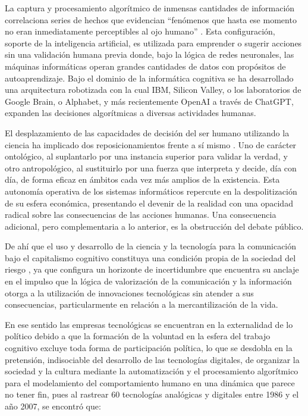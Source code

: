 \documentclass[
  spanish,
  11pt,
  a4paper,
]{scrbook}
\begin{document}
La captura y procesamiento algorítmico de inmensas cantidades de
información correlaciona series de hechos que evidencian ``fenómenos que
hasta ese momento no eran inmediatamente perceptibles al ojo humano''
\autocite[143]{Sadin2018}. Esta configuración, soporte de la
inteligencia artificial, es utilizada para emprender o sugerir acciones
sin una validación humana previa donde, bajo la lógica de redes
neuronales, las máquinas informáticas operan grandes cantidades de datos
con propósitos de autoaprendizaje. Bajo el dominio de la informática
cognitiva se ha desarrollado una arquitectura robotizada con la cual
IBM, Silicon Valley, o los laboratorios de Google Brain, o Alphabet, y
más recientemente OpenAI a través de ChatGPT, expanden las decisiones
algorítmicas a diversas actividades humanas.

El desplazamiento de las capacidades de decisión del ser humano
utilizando la ciencia ha implicado dos reposicionamientos frente a sí
mismo \autocite{Sadin2018}. Uno de carácter ontológico, al suplantarlo
por una instancia superior para validar la verdad, y otro antropológico,
al sustituirlo por una fuerza que interpreta y decide, día con día, de
forma eficaz en ámbitos cada vez más amplios de la existencia. Esta
autonomía operativa de los sistemas informáticos repercute en la
despolitización de su esfera económica, presentando el devenir de la
realidad con una opacidad radical sobre las consecuencias de las
acciones humanas. Una consecuencia adicional, pero complementaria a lo
anterior, es la obstrucción del debate público.

De ahí que el uso y desarrollo de la ciencia y la tecnología para la
comunicación bajo el capitalismo cognitivo constituya una condición
propia de la sociedad del riesgo \autocite{Beck1998}, ya que configura
un horizonte de incertidumbre que encuentra su anclaje en el impulso que
la lógica de valorización de la comunicación y la información otorga a
la utilización de innovaciones tecnológicas sin atender a sus
consecuencias, particularmente en relación a la mercantilización de la
vida.

En ese sentido las empresas tecnológicas se encuentran en la
externalidad de lo político debido a que la formación de la voluntad en
la esfera del trabajo cognitivo excluye toda forma de participación
política, lo que se desdobla en la pretensión, indisociable del
desarrollo de las tecnologías digitales, de organizar la sociedad y la
cultura mediante la automatización y el procesamiento algorítmico para
el modelamiento del comportamiento humano en una dinámica que parece no
tener fin, pues al rastrear 60 tecnologías analógicas y digitales entre
1986 y el año 2007, se encontró que:
\end{document}
